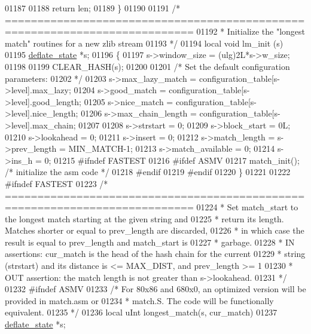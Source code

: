 \begin{DoxyCode}
{01187 
01188     \textcolor{keywordflow}{return} len;
01189 \}
01190 
01191 \textcolor{comment}{/* ===========================================================================}
01192 \textcolor{comment}{ * Initialize the "longest match" routines for a new zlib stream}
01193 \textcolor{comment}{ */}
01194 local \textcolor{keywordtype}{void} lm\_init (s)
01195     \hyperlink{structinternal__state}{deflate\_state} *s;
01196 \{
01197     s->window\_size = (ulg)2L*s->w\_size;
01198 
01199     CLEAR\_HASH(s);
01200 
01201     \textcolor{comment}{/* Set the default configuration parameters:}
01202 \textcolor{comment}{     */}
01203     s->max\_lazy\_match   = configuration\_table[s->level].max\_lazy;
01204     s->good\_match       = configuration\_table[s->level].good\_length;
01205     s->nice\_match       = configuration\_table[s->level].nice\_length;
01206     s->max\_chain\_length = configuration\_table[s->level].max\_chain;
01207 
01208     s->strstart = 0;
01209     s->block\_start = 0L;
01210     s->lookahead = 0;
01211     s->insert = 0;
01212     s->match\_length = s->prev\_length = MIN\_MATCH-1;
01213     s->match\_available = 0;
01214     s->ins\_h = 0;
01215 \textcolor{preprocessor}{#ifndef FASTEST}
01216 \textcolor{preprocessor}{#ifdef ASMV}
01217     match\_init(); \textcolor{comment}{/* initialize the asm code */}
01218 \textcolor{preprocessor}{#endif}
01219 \textcolor{preprocessor}{#endif}
01220 \}
01221 
01222 \textcolor{preprocessor}{#ifndef FASTEST}
01223 \textcolor{comment}{/* ===========================================================================}
01224 \textcolor{comment}{ * Set match\_start to the longest match starting at the given string and}
01225 \textcolor{comment}{ * return its length. Matches shorter or equal to prev\_length are discarded,}
01226 \textcolor{comment}{ * in which case the result is equal to prev\_length and match\_start is}
01227 \textcolor{comment}{ * garbage.}
01228 \textcolor{comment}{ * IN assertions: cur\_match is the head of the hash chain for the current}
01229 \textcolor{comment}{ *   string (strstart) and its distance is <= MAX\_DIST, and prev\_length >= 1}
01230 \textcolor{comment}{ * OUT assertion: the match length is not greater than s->lookahead.}
01231 \textcolor{comment}{ */}
01232 \textcolor{preprocessor}{#ifndef ASMV}
01233 \textcolor{comment}{/* For 80x86 and 680x0, an optimized version will be provided in match.asm or}
01234 \textcolor{comment}{ * match.S. The code will be functionally equivalent.}
01235 \textcolor{comment}{ */}
01236 local uInt longest\_match(s, cur\_match)
01237     \hyperlink{structinternal__state}{deflate\_state} *s;
}
\end{DoxyCode}

